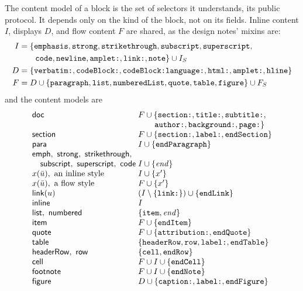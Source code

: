 \documentclass[11pt]{article}
\numberwithin{equation}{section}
\newcommand{\kw}[1]{\ensuremath{\mathsf{#1}}}
\newcommand{\str}[1]{\ensuremath{\text{\texttt{#1}}}}
\begin{document}
The content model of a block is the set of selectors it understands, its
public protocol.  It depends only on the kind of the block, not on its
fields.  Inline content $I$, displays $D$, and flow
content $F$ are shared, as the design notes' mixins are:
\begin{equation}\label{eq:lib-models}
\begin{aligned}
I &= \{\str{emphasis}, \str{strong},
  \str{strikethrough}, \str{subscript}, \str{superscript}, \\
  &\qquad \str{code}, \str{newline}, \str{amplet:},
  \str{link:}, \str{note}\} \cup I_S \\
D &= \{\str{verbatim:}, \str{codeBlock:}, \str{codeBlock:language:},
  \str{html:}, \str{amplet:}, \str{hline}\} \\
F &= D \cup \{\str{paragraph}, \str{list}, \str{numberedList},
  \str{quote}, \str{table}, \str{figure}\} \cup F_S
\end{aligned}
\end{equation}
and the content models are
\begin{equation}\label{eq:lib-model-table}
\begin{array}{@{}l@{\;}l@{}}
\kw{doc} & F \cup \{\str{section:}, \str{title:}, \str{subtitle:}, \\
  & \qquad \str{author:}, \str{background:}, \str{page:}\} \\
\kw{section} & F \cup \{\str{section:}, \str{label:}, \str{endSection}\} \\
\kw{para} & I \cup \{\str{endParagraph}\} \\
\kw{emph},\ \kw{strong},\ \kw{strikethrough}, \\
\quad \kw{subscript},\ \kw{superscript},\ \kw{code} & I \cup \{\mathit{end}\} \\
x(\bar u),\ \text{an inline style} & I \cup \{x'\} \\
x(\bar u),\ \text{a flow style} & F \cup \{x'\} \\
\kw{link}(u) & (I \setminus \{\str{link:}\}) \cup \{\str{endLink}\} \\
\kw{inline} & I \\
\kw{list},\ \kw{numbered} & \{\str{item}, \mathit{end}\} \\
\kw{item} & F \cup \{\str{endItem}\} \\
\kw{quote} & F \cup \{\str{attribution:}, \str{endQuote}\} \\
\kw{table} & \{\str{headerRow}, \str{row}, \str{label:},
  \str{endTable}\} \\
\kw{headerRow},\ \kw{row} & \{\str{cell}, \str{endRow}\} \\
\kw{cell} & F \cup I \cup \{\str{endCell}\} \\
\kw{footnote} & F \cup I \cup \{\str{endNote}\} \\
\kw{figure} & D \cup \{\str{caption:}, \str{label:}, \str{endFigure}\}
\end{array}
\end{equation}
\end{document}
